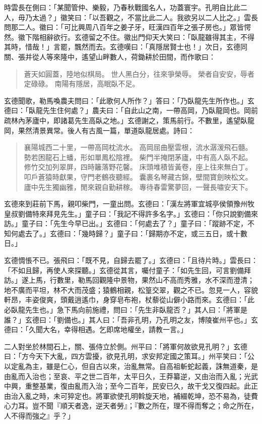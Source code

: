 時雲長在側曰：「某聞管仲、樂毅，乃春秋戰國名人，功蓋寰宇。孔明自比此二人，毋乃太過？」徽笑曰：「以吾觀之，不當比此二人。我欲另以二人比之。」雲長問那二人。徽曰：「可比興周八百年之姜子牙，旺漢四百年之張子房也。」眾皆愕然。徽下階相辭欲行。玄德留之不住。徽出門仰天大笑曰：「臥龍雖得其主，不得其時，惜哉！」言罷，飄然而去。玄德嘆曰：「真隱居賢士也！」次日，玄德同關、張并從人等來隆中，遙望山畔數人，荷鋤耕於田間，而作歌曰：

\begin{quote}
蒼天如圓蓋，陸地似棋局。
世人黑白分，往來爭榮辱。
榮者自安安，辱者定碌碌。
南陽有隱居，高眠臥不足。
\end{quote}

玄德聞歌，勒馬喚農夫問曰：「此歌何人所作？」答曰：「乃臥龍先生所作也。」玄德曰：「臥龍先生住何處？」農夫曰：「自此山之南，一帶高岡，乃臥龍岡也。岡前疏林內茅廬中，即諸葛先生高臥之地。」玄德謝之，策馬前行。不數里，遙望臥龍岡，果然清景異常。後人有古風一篇，單道臥龍居處。詩曰：

\begin{quote}
襄陽城西二十里，一帶高岡枕流水。
高岡屈曲壓雲根，流水潺湲飛石髓。
勢若困龍石上蟠，形如單鳳松陰裡。
柴門半掩閉茅廬，中有高人臥不起。
修竹交加列翠屏，四時籬落野花馨。
床頭堆積皆黃卷，座上往來無白丁。
叩戶蒼猿時獻果，守門老鶴夜聽經。
囊裹名琴藏古錦，壁間寶劍映松文。
廬中先生獨幽雅，閒來親自勤耕稼。
專待春雷驚夢回，一聲長嘯安天下。
\end{quote}

玄德來到莊前下馬，親叩柴門，一童出問。玄德曰：「漢左將軍宜城亭侯領豫州牧皇叔劉備特來拜見先生。」童子曰：「我記不得許多名字。」玄德曰：「你只說劉備來訪。」童子曰：「先生今早已出。」玄德曰：「何處去了？」童子曰：「蹤跡不定，不知何處去了。」玄德曰：「幾時歸？」童子曰：「歸期亦不定，或三五日，或十數日。」

玄德惆悵不已。張飛曰：「既不見，自歸去罷了。」玄德曰：「且待片時。」雲長曰：「不如且歸，再使人來探聽。」玄德從其言，囑付童子：「如先生回，可言劉備拜訪。」遂上馬，行數里，勒馬回觀隆中景物，果然山不高而秀雅，水不深而澄清；地不廣而平坦，林不大而茂盛；猿鶴相親，松篁交翠，觀之不已。忽見一人，容貌軒昂，丰姿俊爽，頭戴逍遙巾，身穿皂布袍，杖藜從山僻小路而來。玄德曰：「此必臥龍先生也。」急下馬向前施禮，問曰：「先生非臥龍否？」其人曰：「將軍是誰？」玄德曰：「劉備也。」其人曰：「吾非孔明，乃孔明之友，博陵崔州平也。」玄德曰：「久聞大名，幸得相遇。乞即席地權坐，請教一言。」

二人對坐於林間石上，關、張侍立於側。州平曰：「將軍何故欲見孔明？」玄德曰：「方今天下大亂，四方雲擾，欲見孔明，求安邦定國之策耳。」州平笑曰：「公以定亂為主，雖是仁心，但自古以來，治亂無常。自高祖斬蛇起義，誅無道秦，是由亂而入治也；至哀、平之世二百年，太平日久，王莽纂逆，又由治而入亂；光武中興，重整基業，復由亂而入治；至今二百年，民安已久，故干戈又復四起。此正由治入亂之時，未可猝定也。將軍欲使孔明斡旋天地，補綴乾坤，恐不易為，徒費心力耳。豈不聞『順天者逸，逆天者勞』；『數之所在，理不得而奪之；命之所在，人不得而強之』乎？」

